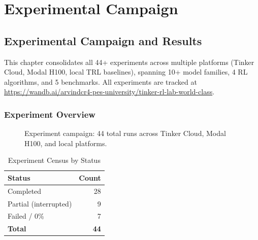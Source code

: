 \documentclass[12pt,a4paper]{report}
\theoremstyle{definition}
\begin{document}
\part{Experimental Campaign}


\chapter{Experimental Campaign and Results}
\label{ch:experiments}

This chapter consolidates all 44+ experiments across multiple platforms (Tinker Cloud, Modal H100, local TRL baselines),
spanning 10+ model families, 4 RL algorithms, and 5 benchmarks. All experiments are tracked at
\url{https://wandb.ai/arvindcr4-pes-university/tinker-rl-lab-world-class}.

\section{Experiment Overview}
\label{sec:exp-overview}

\begin{figure}[htbp]
\centering
{}
\caption{Experiment campaign: 44 total runs across Tinker Cloud, Modal H100, and local platforms.}
\label{fig:exp-status}
\end{figure}


\begin{table}[htbp]
\centering
\caption{Experiment Census by Status}
\begin{tabular}{lr}
\toprule
\textbf{Status} & \textbf{Count} \\
\midrule
Completed & 28 \\
Partial (interrupted) & 9 \\
Failed / 0\% & 7 \\
\midrule
\textbf{Total} & \textbf{44} \\
\bottomrule
\end{tabular}
\label{tab:exp-census}
\end{table}
\end{document}
